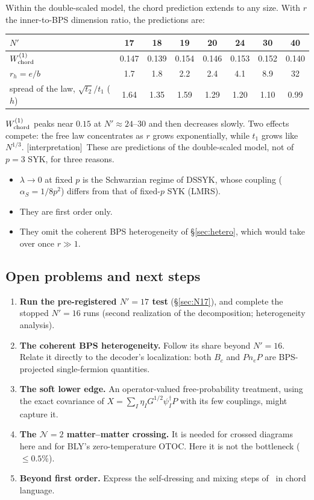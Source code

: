 \documentclass[11pt]{article}
\newcommand{\Np}{N'}
\newcommand{\Wone}{W^{(1)}}
\newcommand{\tagbox}[2]{\textsf{\small\color{#1}[#2]}}
\newcommand{\INTERP}{\tagbox{cconj}{interpretation}}
\theoremstyle{plain}
\theoremstyle{remark}
\numberwithin{equation}{section}
\begin{document}
Within the double-scaled model, the chord prediction extends to any size. With $r$ the inner-to-BPS dimension ratio,
the predictions are:
\begin{center}\small
\begin{tabular}{lccccccc}\toprule
$\Np$ & 17 & 18 & 19 & 20 & 24 & 30 & 40\\\midrule
$\Wone_{\rm chord}$ & 0.147 & 0.139 & 0.154 & 0.146 & 0.153 & 0.152 & 0.140\\
$r_h=e/b$ & 1.7 & 1.8 & 2.2 & 2.4 & 4.1 & 8.9 & 32\\
spread of the law, $\sqrt{t_2}/t_1$ ($h$) & 1.64 & 1.35 & 1.59 & 1.29 & 1.20 & 1.10 & 0.99\\\bottomrule
\end{tabular}
\end{center}
$\Wone_{\rm chord}$ peaks near $0.15$ at $\Np\approx24$--$30$ and then decreases slowly. Two effects compete: the free
law concentrates as $r$ grows exponentially, while $t_1$ grows like $N^{1/3}$. \INTERP\ These are predictions of the
double-scaled model, not of $p=3$ SYK, for three reasons.
\begin{itemize}\itemsep1pt
\item $\lambda\to0$ at fixed $p$ is the Schwarzian regime of DSSYK, whose coupling ($\alpha_S=1/8p^2$) differs from
  that of fixed-$p$ SYK (LMRS).
\item They are first order only.
\item They omit the coherent BPS heterogeneity of \S\ref{sec:hetero}, which would take over once $r\gg1$.
\end{itemize}

\subsection{Open problems and next steps}

\begin{enumerate}\itemsep2pt
\item \textbf{Run the pre-registered $\Np=17$ test} (\S\ref{sec:N17}), and complete the stopped $\Np=16$ runs
  (second realization of the decomposition; heterogeneity analysis).
\item \textbf{The coherent BPS heterogeneity.} Follow its share beyond $\Np=16$. Relate it directly to the decoder's
  localization: both $B_c$ and $Pn_eP$ are BPS-projected single-fermion quantities.
\item \textbf{The soft lower edge.} An operator-valued free-probability treatment, using the exact covariance of
  $X=\sum_I\eta_IG^{1/2}\psi_I^\dagger P$ with its few couplings, might capture it.
\item \textbf{The $\mathcal N=2$ matter--matter crossing.} It is needed for crossed diagrams here and for BLY's
  zero-temperature OTOC. Here it is not the bottleneck ($\le0.5\%$).
\item \textbf{Beyond first order.} Express the self-dressing and mixing steps of~\cite{prog1013} in chord language.
\end{enumerate}
\end{document}
